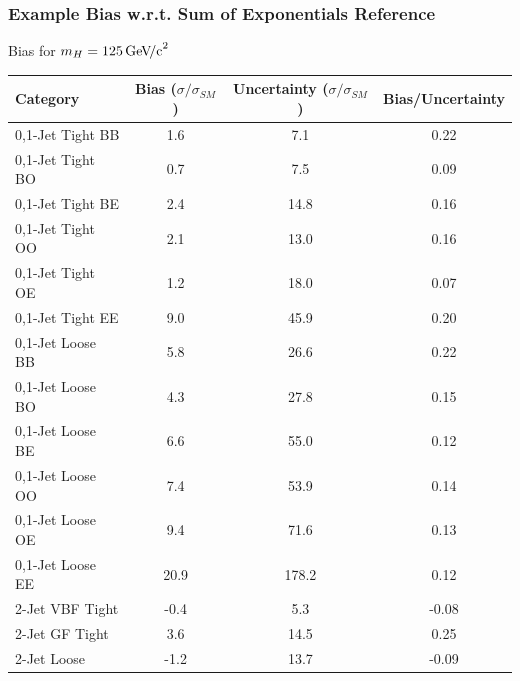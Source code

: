 \documentclass{beamer}
\newcommand{\GeVcc}{\ensuremath{\,\mathrm{Ge\kern -0.1em V\!/c}^2}}
\begin{document}
\begin{frame}
\frametitle{Example Bias w.r.t. Sum of Exponentials Reference}
  \vspace{-1ex}
  \begin{center}
    Bias for $m_H=125\GeVcc{}$
    \\ \vspace{0.5ex}
    \scriptsize
    \begin{tabular}{|l|c|c|c|} \hline
Category                  & Bias ($\sigma/\sigma_{SM}$) & Uncertainty  ($\sigma/\sigma_{SM}$) & Bias/Uncertainty \\ \hline \hline
0,1-Jet Tight BB         &        1.6 &        7.1 &       0.22 \\ \hline
0,1-Jet Tight BO         &        0.7 &        7.5 &       0.09 \\ \hline
0,1-Jet Tight BE         &        2.4 &       14.8 &       0.16 \\ \hline
0,1-Jet Tight OO         &        2.1 &       13.0 &       0.16 \\ \hline
0,1-Jet Tight OE         &        1.2 &       18.0 &       0.07 \\ \hline
0,1-Jet Tight EE         &        9.0 &       45.9 &       0.20 \\ \hline
0,1-Jet Loose BB         &        5.8 &       26.6 &       0.22 \\ \hline
0,1-Jet Loose BO         &        4.3 &       27.8 &       0.15 \\ \hline
0,1-Jet Loose BE         &        6.6 &       55.0 &       0.12 \\ \hline
0,1-Jet Loose OO         &        7.4 &       53.9 &       0.14 \\ \hline
0,1-Jet Loose OE         &        9.4 &       71.6 &       0.13 \\ \hline
0,1-Jet Loose EE         &       20.9 &      178.2 &       0.12 \\ \hline
2-Jet VBF Tight          &       -0.4 &        5.3 &      -0.08 \\ \hline
2-Jet GF Tight           &        3.6 &       14.5 &       0.25 \\ \hline
2-Jet Loose              &       -1.2 &       13.7 &      -0.09 \\ \hline
    \end{tabular}
\\
  \small
  \end{center}
\end{frame}
\end{document}
